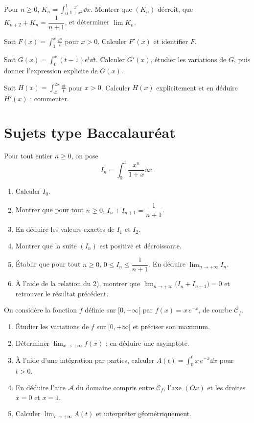 \exo{} Pour $n\ge0$, $\displaystyle K_n=\int_0^1 \frac{x^n}{1+x^2}\dd x$. Montrer que
$(K_n)$ décroît, que $K_{n+2}+K_n=\dfrac1{n+1}$, et déterminer $\lim K_n$.

\exo{} Soit $\displaystyle F(x)=\int_1^x\frac{\dd t}{t}$ pour $x>0$. Calculer $F'(x)$ et
identifier $F$.

\exo{} Soit $\displaystyle G(x)=\int_0^x (t-1)e^{t}\dd t$. Calculer $G'(x)$, étudier les
variations de $G$, puis donner l'expression explicite de $G(x)$.

\exo{} Soit $\displaystyle H(x)=\int_x^{2x}\frac{\dd t}{t}$ pour $x>0$. Calculer $H(x)$
explicitement et en déduire $H'(x)$ ; commenter.

\section{Sujets type Baccalauréat}

Pour tout entier $n\ge0$, on pose
\[
I_n=\int_0^1 \frac{x^n}{1+x}\dd x.
\]
\begin{enumerate}[label=\arabic*)]
\item Calculer $I_0$.
\item Montrer que pour tout $n\ge0$, $I_n+I_{n+1}=\dfrac{1}{n+1}$.
\item En déduire les valeurs exactes de $I_1$ et $I_2$.
\item Montrer que la suite $(I_n)$ est positive et décroissante.
\item Établir que pour tout $n\ge0$, $0\le I_n\le\dfrac{1}{n+1}$. En déduire $\displaystyle\lim_{n\to+\infty}I_n$.
\item À l'aide de la relation du 2), montrer que $\displaystyle\lim_{n\to+\infty}\big(I_n+I_{n+1}\big)=0$
et retrouver le résultat précédent.
\end{enumerate}

On considère la fonction $f$ définie sur $[0,+\infty[$ par $f(x)=x\,e^{-x}$, de courbe $\mathcal C_f$.
\begin{enumerate}[label=\arabic*)]
\item Étudier les variations de $f$ sur $[0,+\infty[$ et préciser son maximum.
\item Déterminer $\displaystyle\lim_{x\to+\infty}f(x)$ ; en déduire une asymptote.
\item À l'aide d'une intégration par parties, calculer $\displaystyle A(t)=\int_0^t x\,e^{-x}\dd x$
pour $t>0$.
\item En déduire l'aire $\mathcal A$ du domaine compris entre $\mathcal C_f$, l'axe $(Ox)$ et les
droites $x=0$ et $x=1$.
\item Calculer $\displaystyle\lim_{t\to+\infty}A(t)$ et interpréter géométriquement.
\end{enumerate}


